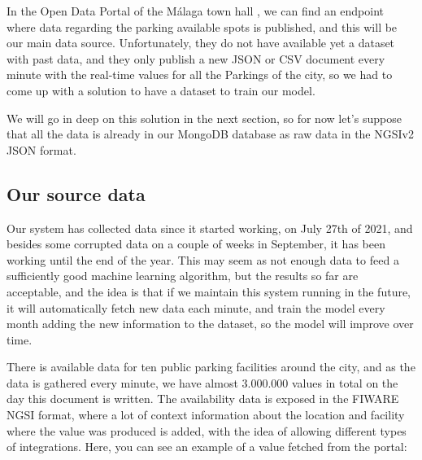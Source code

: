 In the Open Data Portal of the Málaga town hall\cite{OpenDataParkingMalaga} , we can find an endpoint where data regarding the parking available spots is published, and this will be our main data source. Unfortunately, they do not have available yet a dataset with past data, and they only publish a new JSON or CSV document every minute with the real-time values for all the Parkings of the city, so we had to come up with a solution to have a dataset to train our model. 

We will go in deep on this solution in the next section, so for now let's suppose that all the data is already in our MongoDB database as raw data in the NGSIv2 JSON format.

\subsection{Our source data}

Our system has collected data since it started working, on July 27th of 2021, and besides some corrupted data on a couple of weeks in September, it has been working until the end of the year. This may seem as not enough data to feed a sufficiently good machine learning algorithm, but the results so far are acceptable, and the idea is that if we maintain this system running in the future, it will automatically fetch new data each minute, and train the model every month adding the new information to the dataset, so the model will improve over time. 

There is available data for ten public parking facilities around the city, and as the data is gathered every minute, we have almost 3.000.000 values in total on the day this document is written. The availability data is exposed in the FIWARE NGSI format, where a lot of context information about the location and facility where the value was produced is added, with the idea of allowing different types of integrations. Here, you can see an example of a value fetched from the portal: 

